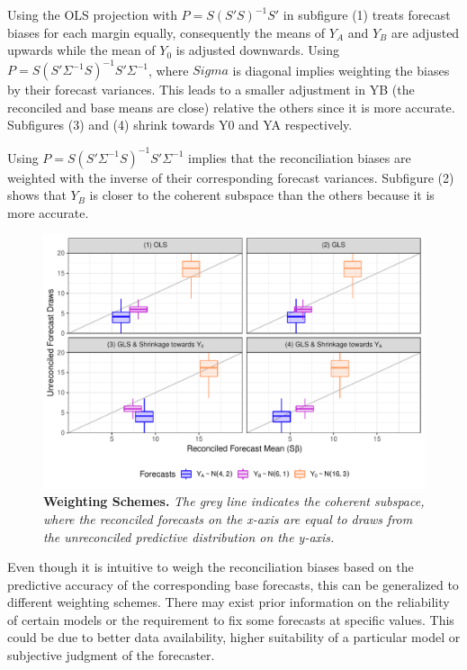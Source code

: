 \documentclass[a4paper,fleqn,11pt]{article}
\begin{document}
Using the OLS projection with $P = S(S'S)^{-1}S'$ in subfigure (1) treats forecast biases for each margin equally, consequently the means of $Y_A$ and $Y_B$ are adjusted upwards while the mean of $Y_0$ is adjusted downwards. Using $P = S(S'\Sigma^{-1}S)^{-1}S'\Sigma^{-1}$, where $Sigma$ is diagonal implies weighting the biases by their forecast variances. This leads to a smaller adjustment in YB (the reconciled and base means are close) relative the others since it is more accurate. Subfigures (3) and (4) shrink towards Y0 and YA respectively.

Using $P = S(S'\Sigma^{-1}S)^{-1}S'\Sigma^{-1}$ implies that the reconciliation biases are weighted with the inverse of their corresponding forecast variances. Subfigure (2) shows that $Y_B$ is closer to the coherent subspace than the others because it is more accurate. 
\begin{figure}[H]
	\includegraphics[width=\textwidth]{fig/fig_biases}
	\caption[Weighting Schemes]{\textbf{Weighting Schemes.} \textit{The grey line indicates the coherent subspace, where the reconciled forecasts on the x-axis are equal to draws from the unreconciled predictive distribution on the y-axis.}}\label{fig:weights}
\end{figure}
Even though it is intuitive to weigh the reconciliation biases based on the predictive accuracy of the corresponding base forecasts, this can be generalized to different weighting schemes. There may exist prior information on the reliability of certain models or the requirement to fix some forecasts at specific values. This could be due to better data availability, higher suitability of a particular model or subjective judgment of the forecaster. 
\end{document}
